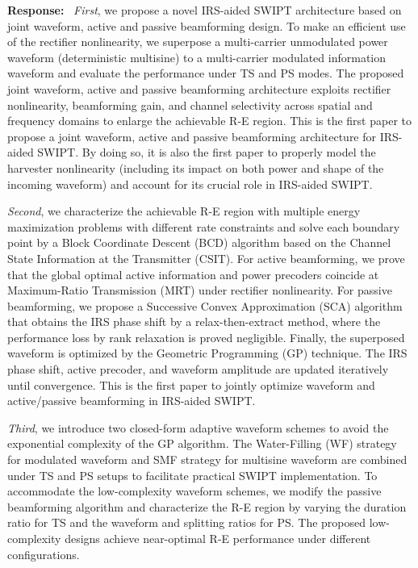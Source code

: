 \documentclass{article}
\newcounter{reviewer}
\newcounter{point}[reviewer]
\newcounter{response}[reviewer]
\newenvironment{response}
	{\refstepcounter{response} \medskip \noindent \textbf{Response:}\ }
	{\medskip}
\begin{document}
\begin{reviewer}
\begin{response}
			\emph{First}, we propose a novel IRS-aided SWIPT architecture based on joint waveform, active and passive beamforming design. To make an efficient use of the rectifier nonlinearity, we superpose a multi-carrier unmodulated power waveform (deterministic multisine) to a multi-carrier modulated information waveform and evaluate the performance under TS and PS modes. The proposed joint waveform, active and passive beamforming architecture exploits rectifier nonlinearity, beamforming gain, and channel selectivity across spatial and frequency domains to enlarge the achievable R-E region. This is the first paper to propose a joint waveform, active and passive beamforming architecture for IRS-aided SWIPT. By doing so, it is also the first paper to properly model the harvester nonlinearity (including its impact on both power and shape of the incoming waveform) and account for its crucial role in IRS-aided SWIPT.

			\emph{Second}, we characterize the achievable R-E region with multiple energy maximization problems with different rate constraints and solve each boundary point by a Block Coordinate Descent (BCD) algorithm based on the Channel State Information at the Transmitter (CSIT). For active beamforming, we prove that the global optimal active information and power precoders coincide at Maximum-Ratio Transmission (MRT) under rectifier nonlinearity. For passive beamforming, we propose a Successive Convex Approximation (SCA) algorithm that obtains the IRS phase shift by a relax-then-extract method, where the performance loss by rank relaxation is proved negligible. Finally, the superposed waveform is optimized by the Geometric Programming (GP) technique. The IRS phase shift, active precoder, and waveform amplitude are updated iteratively until convergence. This is the first paper to jointly optimize waveform and active/passive beamforming in IRS-aided SWIPT.

			\emph{Third}, we introduce two closed-form adaptive waveform schemes to avoid the exponential complexity of the GP algorithm. The Water-Filling (WF) strategy for modulated waveform and SMF strategy for multisine waveform are combined under TS and PS setups to facilitate practical SWIPT implementation. To accommodate the low-complexity waveform schemes, we modify the passive beamforming algorithm and characterize the R-E region by varying the duration ratio for TS and the waveform and splitting ratios for PS. The proposed low-complexity designs achieve near-optimal R-E performance under different configurations.


\end{response}
\end{reviewer}
\end{document}
